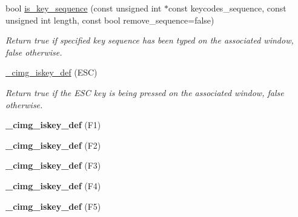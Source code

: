 \begin{Indent}
\begin{DoxyCompactItemize}
bool \hyperlink{structcimg__library__suffixed_1_1CImgDisplay_a020fb9bb882e885c1e7e9b82a0183d80}{is\+\_\+key\+\_\+sequence} (const unsigned int $\ast$const keycodes\+\_\+sequence, const unsigned int length, const bool remove\+\_\+sequence=false)
\begin{DoxyCompactList}\small\item\em Return {\ttfamily true} if specified key sequence has been typed on the associated window, {\ttfamily false} otherwise. \end{DoxyCompactList}\item 
\hyperlink{structcimg__library__suffixed_1_1CImgDisplay_ab9275de6b6ba9ecdf03a5547d571fcc6}{\+\_\+cimg\+\_\+iskey\+\_\+def} (E\+SC)
\begin{DoxyCompactList}\small\item\em Return {\ttfamily true} if the {\ttfamily E\+SC} key is being pressed on the associated window, {\ttfamily false} otherwise. \end{DoxyCompactList}\item 
\mbox{\label{structcimg__library__suffixed_1_1CImgDisplay_a7553695608d5f47a317b47a3ebeff216}} 
{\bfseries \+\_\+cimg\+\_\+iskey\+\_\+def} (F1)
\item 
\mbox{\label{structcimg__library__suffixed_1_1CImgDisplay_a14349914a5f8b21eef2dfd706c975740}} 
{\bfseries \+\_\+cimg\+\_\+iskey\+\_\+def} (F2)
\item 
\mbox{\label{structcimg__library__suffixed_1_1CImgDisplay_a29b7ccec339e87d6a6c7e2a8820c28e1}} 
{\bfseries \+\_\+cimg\+\_\+iskey\+\_\+def} (F3)
\item 
\mbox{\label{structcimg__library__suffixed_1_1CImgDisplay_a24329124c3e9626c349e2c0d44e30a5c}} 
{\bfseries \+\_\+cimg\+\_\+iskey\+\_\+def} (F4)
\item 
\mbox{\label{structcimg__library__suffixed_1_1CImgDisplay_a87e83426db114c9700b152692c78aa97}} 
{\bfseries \+\_\+cimg\+\_\+iskey\+\_\+def} (F5)
\item 
\mbox{\label{structcimg__library__suffixed_1_1CImgDisplay_a0f305aeda4d2a7d4bb0f327541c9db1b}} 

\end{DoxyCompactItemize}
\end{Indent}
